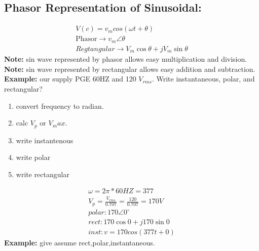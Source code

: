 \documentclass[a4paper,12]{article}
\begin{document}
   \subsection{Phasor Representation of Sinusoidal:}
   \begin{gather}
       V(c)=v_m cos(\omega t+\theta)\\
       \text{Phasor}\rightarrow v_m\angle\theta\\
       Regtangular\rightarrow V_m \cos{\theta}+j V_m \sin{\theta}
   \end{gather}
   \textbf{Note:} sin wave represented by phasor allows easy multiplication and division. \\
   \textbf{Note:} sin wave represented by rectangular allows easy addition and subtraction.\\
   \textbf{Example:} our supply PGE 60HZ and 120 $V_{rms}$. Write instantaneous, polar, and rectangular?\\
   \begin{enumerate}
       \item convert frequency to radian.
       \item calc $V_p$ or $V_max$.
       \item write instantenous 
       \item write polar
       \item write rectangular
   \end{enumerate}
   \begin{gather}
        \omega=2\pi*60HZ=377\\
       V_p=\frac{V_{rms}}{0.707}=\frac{120}{0.707}=170V\\
       polar:170\angle 0^\circ\\
       rect:170\cos{0}+j170\sin{0}\\
       inst:v=170cos(377t+0)
   \end{gather}
   \textbf{Example:} give assume rect,polar,instantaneous.
\end{document}
